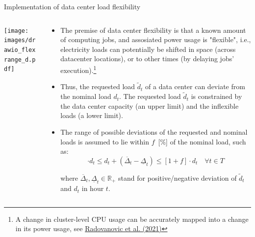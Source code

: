 \begin{frame}{Implementation of data center load flexibility}

{\footnotesize
  \begin{columns}[T]

  \begin{column}{6cm}
  \centering
  \vspace{0.2cm}
  \texttt{[image: images/drawio\_flexrange\_d.pdf]}
  \end{column}

  \begin{column}{9cm}
  \begin{itemize}

  \item The premise of data center flexibility is that a known amount of computing jobs, and assosiated power usage is "flexible", i.e., electricity loads can potentially be shifted in space (across datacenter locations), or to other times (by delaying jobs' execution).\footnote{{\scriptsize A change in cluster-level CPU usage can be accurately mapped into a change in its power usage, see \href{https://arxiv.org/abs/2106.11750}{Radovanovic et al. (2021)}}}

  \item Thus, the \alert{requested load $\widetilde{d}_t$} of a data center can deviate from the nominal load $d_t$. The requested load $\widetilde{d}_t$ is constrained by the data center capacity (an upper limit) and the inflexible loads (a lower limit).
  
  \item The range of possible deviations of the requested and nominal loads is assumed to lie within $f$~[\%] of the nominal load, such as:\\
  \begin{equation*}
  [1-f] \cdot d_t \le  d_t + (\overline{\Delta}_t - \underline{\Delta}_t) \le [1+f] \cdot d_t \quad \forall t \in T
  \label{eqn:range}
  \end{equation*}
  
  \vspace{0.1cm}
  \noindent where $\overline{\Delta}_t, \underline{\Delta}_t \in \mathbb{R}_{+}$ stand for positive/negative deviation of $\widetilde{d}_t$ and $d_t$ in hour $t$.
  \end{itemize}

  \end{column}
  \end{columns}
}
\end{frame}



